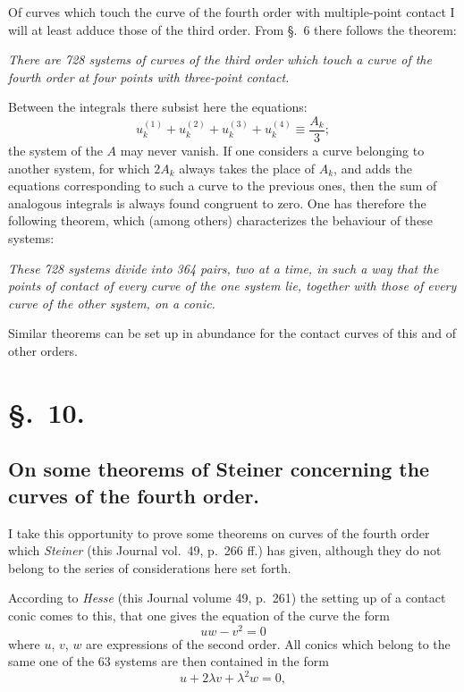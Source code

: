 \documentclass{article}
\begin{document}
Of curves which touch the curve of the fourth order with multiple-point contact I will at least adduce those of the third order. From §.~6 there follows the theorem:

\emph{There are 728 systems of curves of the third order which touch a curve of the fourth order at four points with three-point contact.}

Between the integrals there subsist here the equations:
\[
u_{k}^{(1)}+u_{k}^{(2)}+u_{k}^{(3)}+u_{k}^{(4)} \equiv \frac{A_{k}}{3};
\]
the system of the $A$ may never vanish. If one considers a curve belonging to another system, for which $2A_{k}$ always takes the place of $A_{k}$, and adds the equations corresponding to such a curve to the previous ones, then the sum of analogous integrals is always found congruent to zero. One has therefore the following theorem, which (among others) characterizes the behaviour of these systems:

\emph{These 728 systems divide into 364 pairs, two at a time, in such a way that the points of contact of every curve of the one system lie, together with those of every curve of the other system, on a conic.}

Similar theorems can be set up in abundance for the contact curves of this and of other orders.

\section*{§.~10.}

\subsection*{On some theorems of Steiner concerning the curves of the fourth order.}

I take this opportunity to prove some theorems on curves of the fourth order which \emph{Steiner} (this Journal vol.\ 49, p.\ 266 ff.) has given, although they do not belong to the series of considerations here set forth.

According to \emph{Hesse} (this Journal volume 49, p.\ 261) the setting up of a contact conic comes to this, that one gives the equation of the curve the form
\[
uw - v^{2} = 0
\]
where $u$, $v$, $w$ are expressions of the second order. All conics which belong to the same one of the 63 systems are then contained in the form
\[
u + 2\lambda v + \lambda^{2} w = 0,
\]
\end{document}
